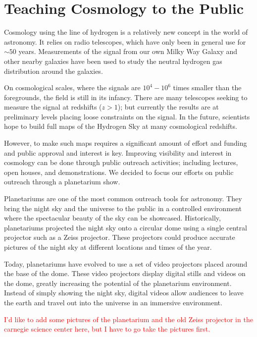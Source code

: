 \chapter{Teaching \cm Cosmology to the Public}\label{Ch:Planet}
Cosmology using the \cm line of hydrogen is a relatively new concept in the world of astronomy. It relies on radio telescopes, which have only been in general use for $\sim 50$ years. Measurements of the \cm signal from our own Milky Way Galaxy and other nearby galaxies have been used to study the neutral hydrogen gas distribution around the galaxies. 

On cosmological scales, where the \cm signals are $10^4 - 10^6$ times smaller than the foregrounds, the field is still in its infancy. There are many telescopes seeking to measure the \cm signal at redshifts ($z>1$); but currently the results are at preliminary levels placing loose constraints on the signal. In the future, scientists hope to build full maps of the Hydrogen Sky at many cosmological redshifts.  

However, to make such maps requires a significant amount of effort and funding and public approval and interest is key. Improving visibility and interest in \cm cosmology can be done through public outreach activities; including lectures, open houses, and demonstrations. We decided to focus our efforts on public outreach through a planetarium show. 

Planetariums are one of the most common outreach tools for astronomy. They bring the night sky and the universe to the public in a controlled environment where the spectacular beauty of the sky can be showcased. Historically, planetariums projected the night sky onto a circular dome using a single central projector such as a Zeiss projector. These projectors could produce accurate pictures of the night sky at different locations and times of the year.

Today, planetariums have evolved to use a set of video projectors placed around the base of the dome. These video projectors display digital stills and videos on the dome, greatly increasing the potential of the planetarium environment. Instead of simply showing the night sky, digital videos allow audiences to leave the earth and travel out into the universe in an immersive environment. 

\textcolor{red}{I'd like to add some pictures of the planetarium and the old Zeiss projector in the carnegie science center here, but I have to go take the pictures first.}

